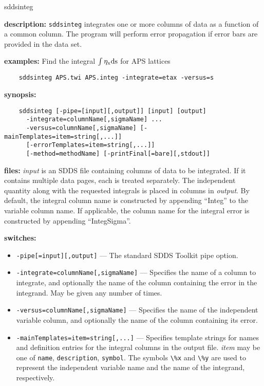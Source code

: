 \begin{sddsprog}{sddsinteg}
  \item {\bf description:} \verb|sddsinteg| integrates one or more columns of data as a function of a common column. The program will perform error propagation if error bars are provided in the data set.
  \item {\bf examples:}
    Find the integral ${\rm \int \eta_x ds}$ for APS lattices
    \begin{verbatim}
    sddsinteg APS.twi APS.integ -integrate=etax -versus=s
    \end{verbatim}
  \item {\bf synopsis:}
    \begin{verbatim}
    sddsinteg [-pipe=[input][,output]] [input] [output]
      -integrate=columnName[,sigmaName] ...
      -versus=columnName[,sigmaName] [-mainTemplates=item=string[,...]]
      [-errorTemplates=item=string[,...]]
      [-method=methodName] [-printFinal[=bare][,stdout]]
    \end{verbatim}
  \item {\bf files:}
    {\em input} is an SDDS file containing columns of data to be integrated. If it contains multiple data pages, each is treated separately. The independent quantity along with the requested integrals is placed in columns in {\em output}. By default, the integral column name is constructed by appending ``Integ'' to the variable column name. If applicable, the column name for the integral error is constructed by appending ``IntegSigma''.
  \item {\bf switches:}
    \begin{itemize}
      \item \verb|-pipe[=input][,output]| --- The standard SDDS Toolkit pipe option.
      \item \verb|-integrate=columnName[,sigmaName]| --- Specifies the name of a column to integrate, and optionally the name of the column containing the error in the integrand. May be given any number of times.
      \item \verb|-versus=columnName[,sigmaName]| --- Specifies the name of the independent variable column, and optionally the name of the column containing its error.
      \item \verb|-mainTemplates=item=string[,...]| --- Specifies template strings for names and definition entries for the integral columns in the output file. {\em item} may be one of \verb|name|, \verb|description|, \verb|symbol|. The symbols \verb|\%x| and \verb|\%y| are used to represent the independent variable name and the name of the integrand, respectively.

\end{itemize}
\end{sddsprog}
